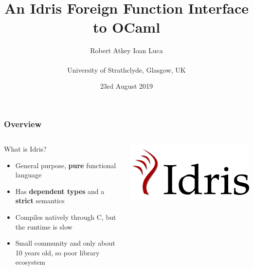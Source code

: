 \documentclass[aspectratio=169]{beamer}
\title{An Idris Foreign Function Interface to OCaml}
\author{Robert Atkey \qquad Ioan Luca\\
  \ \\
  University of Strathclyde, Glasgow, UK}
\date{23rd August 2019}
\begin{document}
\frame{\titlepage}

\newcommand{\youtem}{\quad \textcolor{titlered!80}{---} \quad}

\newcommand{\titlecard}[1]{\begin{frame}%
    \begin{center}%
      \Large \textcolor{titlered}{#1}%
    \end{center}%
  \end{frame}}

\begin{frame}[t]
  \frametitle{Overview}
  \begin{columns}[c]
    \begin{block}{What is Idris?}
      \begin{itemize}
        \item General purpose, \textbf{pure} functional language
        \item Has \textbf{dependent types} and a \textbf{strict} semantics
        \item Compiles natively through C, but the runtime is slow
        \item Small community and only about 10 years old,
              so poor library ecosystem
      \end{itemize}
    \end{block}
    \includegraphics[width=.5\textwidth]{logo.png}
  \end{columns}
\end{frame}
\end{document}
